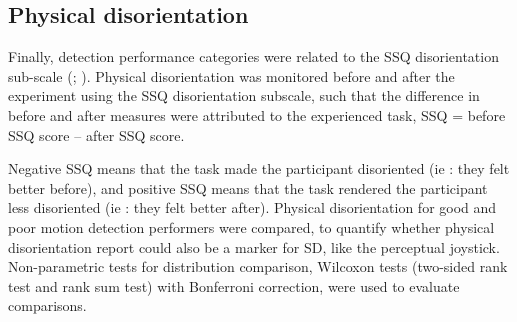 \documentclass[11pt, onecolumn]{article}
\begin{document}
\subsection{Physical disorientation}
Finally, detection performance categories were related to the SSQ disorientation sub-scale (\cite{Kennedy_1993_Simulator}; \cite{Bouchard_2007_SimulatorSickness}).  Physical disorientation was monitored before and after the experiment using the SSQ disorientation subscale, such that the difference in before and after measures were attributed to the experienced task,
SSQ = before SSQ score – after SSQ score.

Negative SSQ means that the task made the participant disoriented (ie : they felt better before), and positive SSQ means that the task rendered the participant less disoriented (ie : they felt better after).  Physical disorientation for good and poor motion detection performers were compared, to quantify whether physical disorientation report could also be a marker for SD, like the perceptual joystick.  Non-parametric tests for distribution comparison, Wilcoxon tests (two-sided rank test and rank sum test) with Bonferroni correction, were used to evaluate comparisons.  
\end{document}
